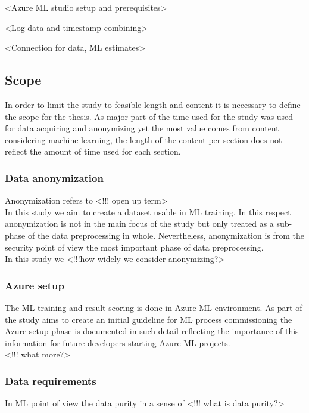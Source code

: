 \documentclass[english, 12pt, a4paper, elec, utf8, a-1b, online]{aaltothesis}
\begin{document}
<Azure ML studio setup and prerequisites>

<Log data and timestamp combining>

<Connection for data, ML estimates>

\subsection{Scope}

In order to limit the study
to feasible length and content
it is necessary to define the scope for the thesis.
As major part of the time used for the study
was used for data acquiring and anonymizing
yet the most value comes from
content considering machine learning,
the length of the content per section
does not reflect
the amount of time used for each section.

\subsubsection*{Data anonymization}
Anonymization refers to <!!! open up term>
\\
In this study we aim to
create a dataset usable in ML training.
In this respect
anonymization is not in the main focus of the study
but only treated as a sub-phase
of the data preprocessing in whole.
Nevertheless,
anonymization is from the security point of view
the most important phase of data preprocessing.
\\
In this study we <!!!how widely we consider anonymizing?>

\subsubsection*{Azure setup}
The ML training and result scoring
is done in Azure ML environment.
As part of the study aims to create
an initial guideline for
ML process commissioning
the Azure setup phase is documented in such detail
reflecting the importance of this information
for future developers
starting Azure ML projects.
\\
<!!! what more?>

\subsubsection*{Data requirements}
In ML point of view
the data purity in a sense of
<!!! what is data purity?>
\end{document}
